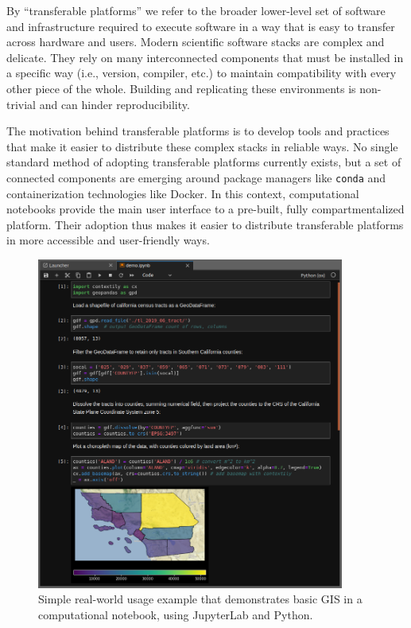\documentclass[11pt,letterpaper]{article}
\begin{document}
By \enquote{transferable platforms} we refer to the broader lower-level set of software and infrastructure required to execute software in a way that is easy to transfer across hardware and users. Modern scientific software stacks are complex and delicate. They rely on many interconnected components that must be installed in a specific way (i.e., version, compiler, etc.) to maintain compatibility with every other piece of the whole. Building and replicating these environments is non-trivial and can hinder reproducibility.

The motivation behind transferable platforms is to develop tools and practices that make it easier to distribute these complex stacks in reliable ways. No single standard method of adopting transferable platforms currently exists, but a set of connected components are emerging around package managers like \texttt{conda} and containerization technologies like Docker. In this context, computational notebooks provide the main user interface to a pre-built, fully compartmentalized platform. Their adoption thus makes it easier to distribute transferable platforms in more accessible and user-friendly ways.

\begin{figure}[!bt]
	\centering
	\includegraphics[width=0.9\textwidth]{code-demo.png}
	\caption{Simple real-world usage example that demonstrates basic GIS in a computational notebook, using JupyterLab and Python.}
	\label{fig:code_demo}
\end{figure}
\end{document}
